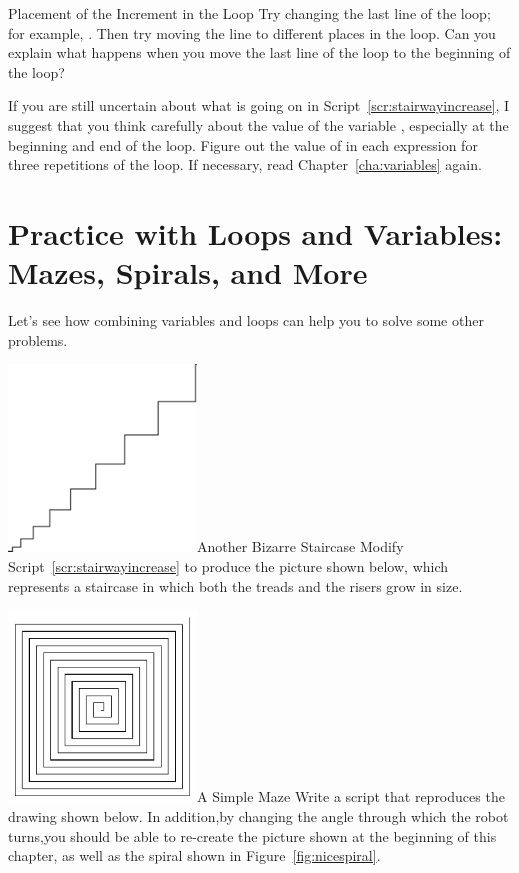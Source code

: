 \documentclass[a4paper,10pt,twoside]{book}
\begin{document}
\begin{exonofigtitle}{Placement of the Increment in the Loop}
Try changing the last line of the loop; for example, . Then try moving the line to different places in the loop. Can you explain what happens when you move the last line of the loop to the beginning of the loop? 
\end{exonofigtitle}

If you are still uncertain about what is going on in Script~\ref{scr:stairwayincrease}, I suggest that you think carefully about the value of the variable , especially at the beginning and end of 
the loop. Figure out the value of  in each expression for three repetitions of the 
loop. If necessary, read Chapter~\ref{cha:variables} again.


\section{Practice with Loops and Variables: Mazes, Spirals, and More} %

Let’s see how combining variables and loops can help you to solve some other problems.

\begin{exofigwithsizeandtitle}[0.6]{\includegraphics[width=5cm]{2dstrangestair}}{Another Bizarre Staircase}
Modify Script~\ref{scr:stairwayincrease} to produce the picture shown below, which represents a staircase in which both the treads and the risers grow in size.
\end{exofigwithsizeandtitle}

\begin{exofigwithsizeandtitle}[0.6]{\includegraphics[width=5cm]{varLoopsMaze}}{A Simple Maze}
Write a script that reproduces the drawing shown below. In addition,by changing the angle through which the robot turns,you should be able to re-create the picture shown at the beginning of this chapter, as well as the spiral shown in Figure~\ref{fig:nicespiral}.
\end{exofigwithsizeandtitle}
\end{document}
